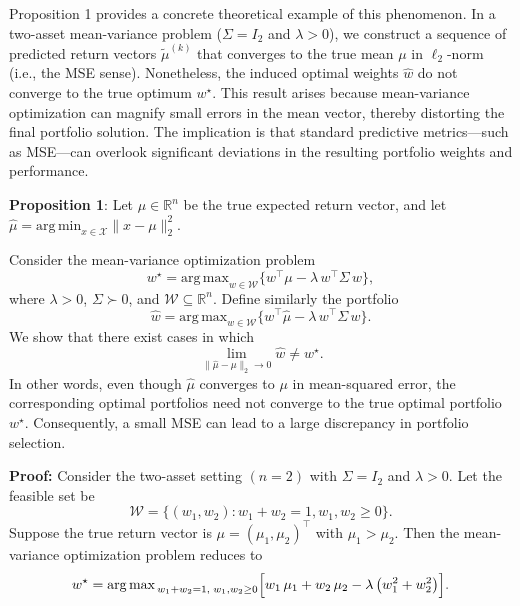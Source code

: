 Proposition 1 provides a concrete theoretical example of this phenomenon. In a two-asset mean-variance problem ($\Sigma = I_2$ and $\lambda > 0$), we construct a sequence of predicted return vectors $\tilde{{\mu}}^{(k)}$ that converges to the true mean ${\mu}$ in $\ell_2$-norm (i.e., the MSE sense). Nonetheless, the induced optimal weights $\hat{{w}}$ do not converge to the true optimum ${w}^\star$. This result arises because mean-variance optimization can magnify small errors in the mean vector, thereby distorting the final portfolio solution. The implication is that standard predictive metrics—such as MSE—can overlook significant deviations in the resulting portfolio weights and performance.

\textbf{Proposition 1}: Let ${\mu}\in \mathbb{R}^n$ be the true expected return vector, and let $\hat{{\mu}} = \mathrm{arg\,min}_{{x} \in \mathcal{X}} \|{x} - {\mu}\|_{2}^{2}$.

Consider the mean-variance optimization problem
\begin{equation}
  {w}^{\star} = \mathrm{arg\,max}_{{w} \in \mathcal{W}}
  \{
    {w}^{\top}{\mu} - \lambda\,{w}^{\top}\Sigma\,{w}
  \},
\end{equation}
where $\lambda > 0$, $\Sigma \succ 0$, and $\mathcal{W} \subseteq \mathbb{R}^n$. Define similarly the portfolio
\begin{equation}
\hat{{w}} = \mathrm{arg\,max}_{{w} \in \mathcal{W}}
  \{
    {w}^{\top} \hat{{\mu}} -  \lambda\,{w}^{\top}\Sigma\,{w}
  \}.
\end{equation}
We show that there exist cases in which  
\begin{equation}
    \lim_{\|\hat{{\mu}} - {\mu}\|_2 \to 0} \hat{{w}}  \neq {w}^{\star}.
\end{equation}
In other words, even though $\hat{{\mu}}$ converges to ${\mu}$ in mean-squared error, the corresponding optimal portfolios need not converge to the true optimal portfolio ${w}^{\star}$. Consequently, a small MSE can lead to a large discrepancy in portfolio selection.

\textbf{Proof: } Consider the two-asset setting $(n = 2)$ with $\Sigma = I_2$ and $\lambda > 0$. Let the feasible set be
\begin{equation}
    \mathcal{W} = \{(w_1, w_2) : w_1 + w_2 = 1,  w_1, w_2 \ge 0 \}.
\end{equation}
Suppose the true return vector is ${\mu} = (\mu_1, \mu_2)^\top$ with $\mu_1 > \mu_2$.  Then the mean-variance optimization problem reduces to
\begin{equation}
    {w}^{\star} =\mathrm{arg\,max}_{\,w_1 + w_2 = 1,\;w_1,w_2 \ge 0}
\Bigl[
    w_1\,\mu_1+ w_2\,\mu_2 -\lambda\,\bigl(w_1^2 + w_2^2\bigr)
\Bigr].
\end{equation}

